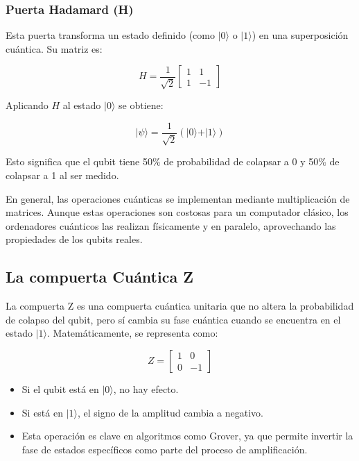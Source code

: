 \documentclass{article}
\begin{document}
\subsubsection*{Puerta Hadamard (H)}

Esta puerta transforma un estado definido (como $\vert 0 \rangle$ o $\vert 1 \rangle$) en una superposición cuántica. Su matriz es:

\[
H = \frac{1}{\sqrt{2}} \begin{bmatrix} 1 & 1 \\ 1 & -1 \end{bmatrix}
\]

Aplicando $H$ al estado $\vert 0 \rangle$ se obtiene:

\[
\vert \psi \rangle = \frac{1}{\sqrt{2}}(\vert 0 \rangle + \vert 1 \rangle)
\]

Esto significa que el qubit tiene 50\% de probabilidad de colapsar a 0 y 50\% de colapsar a 1 al ser medido.

En general, las operaciones cuánticas se implementan mediante multiplicación de matrices. Aunque estas operaciones son costosas para un computador clásico, los ordenadores cuánticos las realizan físicamente y en paralelo, aprovechando las propiedades de los qubits reales.

\subsection*{La compuerta Cuántica Z}

La compuerta Z es una compuerta cuántica unitaria que no altera la probabilidad de 
colapso del qubit, pero sí cambia su fase cuántica cuando se encuentra 
en el estado \(|1\rangle\). Matemáticamente, se representa como:

\[
Z = \begin{bmatrix} 1 & 0 \\ 0 & -1 \end{bmatrix}
\]

\begin{itemize}
    \item Si el qubit está en \(|0\rangle\), no hay efecto.
    \item Si está en \(|1\rangle\), el signo de la amplitud cambia a negativo.
    \item Esta operación es clave en algoritmos como Grover, ya 
            que permite invertir la fase de estados específicos como parte del proceso 
            de amplificación.
\end{itemize}
\end{document}
